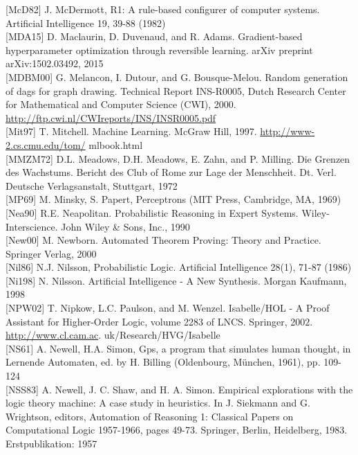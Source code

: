 \documentclass[10pt]{article}
\begin{document}
[McD82] J. McDermott, R1: A rule-based configurer of computer systems. Artificial Intelligence 19, 39-88 (1982)\\[0pt]
[MDA15] D. Maclaurin, D. Duvenaud, and R. Adams. Gradient-based hyperparameter optimization through reversible learning. arXiv preprint arXiv:1502.03492, 2015\\[0pt]
[MDBM00] G. Melancon, I. Dutour, and G. Bousque-Melou. Random generation of dags for graph drawing. Technical Report INS-R0005, Dutch Research Center for Mathematical and Computer Science (CWI), 2000. \href{http://ftp.cwi.nl/CWIreports/INS/INSR0005.pdf}{http://ftp.cwi.nl/CWIreports/INS/INSR0005.pdf}\\[0pt]
[Mit97] T. Mitchell. Machine Learning. McGraw Hill, 1997. \href{http://www-2.cs.cmu.edu/tom/}{http://www-2.cs.cmu.edu/tom/} mlbook.html\\[0pt]
[MMZM72] D.L. Meadows, D.H. Meadows, E. Zahn, and P. Milling. Die Grenzen des Wachstums. Bericht des Club of Rome zur Lage der Menschheit. Dt. Verl. Deutsche Verlagsanstalt, Stuttgart, 1972\\[0pt]
[MP69] M. Minsky, S. Papert, Perceptrons (MIT Press, Cambridge, MA, 1969)\\[0pt]
[Nea90] R.E. Neapolitan. Probabilistic Reasoning in Expert Systems. Wiley-Interscience. John Wiley \& Sons, Inc., 1990\\[0pt]
[New00] M. Newborn. Automated Theorem Proving: Theory and Practice. Springer Verlag, 2000\\[0pt]
[Nil86] N.J. Nilsson, Probabilistic Logic. Artificial Intelligence 28(1), 71-87 (1986)\\[0pt]
[Ni198] N. Nilsson. Artificial Intelligence - A New Synthesis. Morgan Kaufmann, 1998\\[0pt]
[NPW02] T. Nipkow, L.C. Paulson, and M. Wenzel. Isabelle/HOL - A Proof Assistant for Higher-Order Logic, volume 2283 of LNCS. Springer, 2002. \href{http://www.cl.cam.ac}{http://www.cl.cam.ac}. uk/Research/HVG/Isabelle\\[0pt]
[NS61] A. Newell, H.A. Simon, Gps, a program that simulates human thought, in Lernende Automaten, ed. by H. Billing (Oldenbourg, München, 1961), pp. 109-124\\[0pt]
[NSS83] A. Newell, J. C. Shaw, and H. A. Simon. Empirical explorations with the logic theory machine: A case study in heuristics. In J. Siekmann and G. Wrightson, editors, Automation of Reasoning 1: Classical Papers on Computational Logic 1957-1966, pages 49-73. Springer, Berlin, Heidelberg, 1983. Erstpublikation: 1957\\[0pt]
\end{document}
